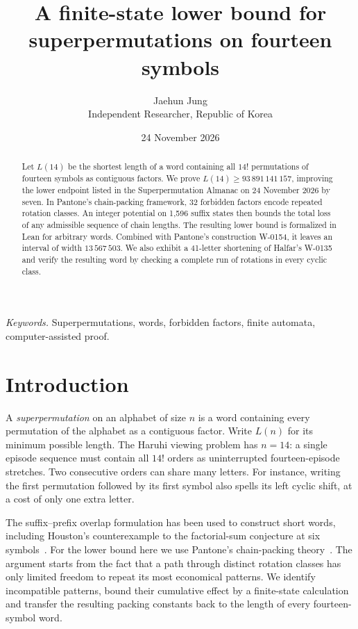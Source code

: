 \documentclass[11pt]{article}
\title{A finite-state lower bound for superpermutations on fourteen symbols}
\author{Jaehun Jung\\[4pt]{\small Independent Researcher, Republic of Korea}}
\date{24 November 2026}
\begin{document}
\maketitle
\begin{abstract}
Let $L(14)$ be the shortest length of a word containing all $14!$ permutations of fourteen symbols as contiguous factors. We prove $L(14)\ge93\,891\,141\,157$, improving the lower endpoint listed in the Superpermutation Almanac on 24 November 2026 by seven. In Pantone's chain-packing framework, 32 forbidden factors encode repeated rotation classes. An integer potential on 1,596 suffix states then bounds the total loss of any admissible sequence of chain lengths. The resulting lower bound is formalized in Lean for arbitrary words. Combined with Pantone's construction W-0154, it leaves an interval of width $13\,567\,503$. We also exhibit a 41-letter shortening of Halfar's W-0135 and verify the resulting word by checking a complete run of rotations in every cyclic class.
\end{abstract}

\noindent\textit{Keywords.} Superpermutations, words, forbidden factors, finite automata, computer-assisted proof.

\section{Introduction}
A \emph{superpermutation} on an alphabet of size $n$ is a word containing every permutation of the alphabet as a contiguous factor. Write $L(n)$ for its minimum possible length. The Haruhi viewing problem has $n=14$: a single episode sequence must contain all $14!$ orders as uninterrupted fourteen-episode stretches. Two consecutive orders can share many letters. For instance, writing the first permutation followed by its first symbol also spells its left cyclic shift, at a cost of only one extra letter.

The suffix--prefix overlap formulation has been used to construct short words, including Houston's counterexample to the factorial-sum conjecture at six symbols~\cite{houston}. For the lower bound here we use Pantone's chain-packing theory~\cite{pantone}. The argument starts from the fact that a path through distinct rotation classes has only limited freedom to repeat its most economical patterns. We identify incompatible patterns, bound their cumulative effect by a finite-state calculation and transfer the resulting packing constants back to the length of every fourteen-symbol word.
\end{document}
